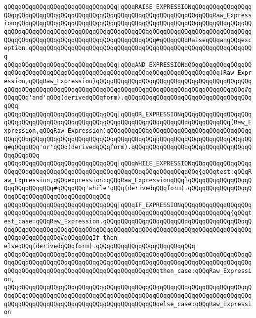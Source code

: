 \verb|qQQqqQQqqQQqqQQqqQQqqQQqqQQqqQQq|\verb#|qQQqRAISE_EXPRESSIONqQQqqQQqqQQqqQQqqQQqqQQqqQQqqQQqqQQqqQQqqQQqqQQqqQQqqQQqqQQqqQQqqQQqqQQqqQQqRaw_ExpressionqQQqqQQqqQQqqQQqqQQqqQQqqQQqqQQqqQQqqQQqqQQqqQQqqQQqqQQqqQQqqQQqqQQqqQQqqQQqqQQqqQQqqQQqqQQqqQQqqQQqqQQqqQQqqQQqqQQqqQQqqQQqqQQqqQQqqQQqqQQqqQQqqQQqqQQqqQQqqQQqqQQqqQQqqQQqqQQqqQQq#\verb|#qQQqqQQqRaiseqQQqanqQQqexception.qQQqqQQqqQQqqQQqqQQqqQQqqQQqqQQqqQQqqQQqqQQqqQQqqQQqqQQqqQQqqQQq|\newline
\verb|qQQqqQQqqQQqqQQqqQQqqQQqqQQqqQQq|\verb#|qQQqAND_EXPRESSIONqQQqqQQqqQQqqQQqqQQqqQQqqQQqqQQqqQQqqQQqqQQqqQQqqQQqqQQqqQQqqQQqqQQqqQQqqQQqqQQq(Raw_Expression,qQQqRaw_Expression)qQQqqQQqqQQqqQQqqQQqqQQqqQQqqQQqqQQqqQQqqQQqqQQqqQQqqQQqqQQqqQQqqQQqqQQqqQQqqQQqqQQqqQQqqQQqqQQqqQQqqQQqqQQqqQQq#\verb|#qQQqqQQq'and'qQQq(derivedqQQqform).qQQqqQQqqQQqqQQqqQQqqQQqqQQqqQQqqQQqqQQq|\newline
\verb|qQQqqQQqqQQqqQQqqQQqqQQqqQQqqQQq|\verb#|qQQqOR_EXPRESSIONqQQqqQQqqQQqqQQqqQQqqQQqqQQqqQQqqQQqqQQqqQQqqQQqqQQqqQQqqQQqqQQqqQQqqQQqqQQqqQQqqQQq(Raw_Expression,qQQqRaw_Expression)qQQqqQQqqQQqqQQqqQQqqQQqqQQqqQQqqQQqqQQqqQQqqQQqqQQqqQQqqQQqqQQqqQQqqQQqqQQqqQQqqQQqqQQqqQQqqQQqqQQqqQQqqQQqqQQq#\verb|#qQQqqQQq'or'qQQq(derivedqQQqform).qQQqqQQqqQQqqQQqqQQqqQQqqQQqqQQqqQQqqQQqqQQq|\newline
\verb|qQQqqQQqqQQqqQQqqQQqqQQqqQQqqQQq|\verb#|qQQqWHILE_EXPRESSIONqQQqqQQqqQQqqQQqqQQqqQQqqQQqqQQqqQQqqQQqqQQqqQQqqQQqqQQqqQQqqQQqqQQqqQQq{qQQqtest:qQQqRaw_Expression,qQQqexpression:qQQqRaw_ExpressionqQQq}qQQqqQQqqQQqqQQqqQQqqQQqqQQqqQQq#\verb|#qQQqqQQq'while'qQQq(derivedqQQqform).qQQqqQQqqQQqqQQqqQQqqQQqqQQqqQQqqQQqqQQqqQQqqQQq|\newline
\verb|qQQqqQQqqQQqqQQqqQQqqQQqqQQqqQQq|\verb#|qQQqIF_EXPRESSIONqQQqqQQqqQQqqQQqqQQqqQQqqQQqqQQqqQQqqQQqqQQqqQQqqQQqqQQqqQQqqQQqqQQqqQQqqQQqqQQqqQQq{qQQqtest_case:qQQqRaw_Expression,qQQqqQQqqQQqqQQqqQQqqQQqqQQqqQQqqQQqqQQqqQQqqQQqqQQqqQQqqQQqqQQqqQQqqQQqqQQqqQQqqQQqqQQqqQQqqQQqqQQqqQQqqQQqqQQqqQQqqQQqqQQqqQQq#\verb|#qQQqqQQqIf-then-elseqQQq(derivedqQQqform).qQQqqQQqqQQqqQQqqQQqqQQqqQQq|\newline
\verb|qQQqqQQqqQQqqQQqqQQqqQQqqQQqqQQqqQQqqQQqqQQqqQQqqQQqqQQqqQQqqQQqqQQqqQQqqQQqqQQqqQQqqQQqqQQqqQQqqQQqqQQqqQQqqQQqqQQqqQQqqQQqqQQqqQQqqQQqqQQqqQQqqQQqqQQqqQQqqQQqqQQqqQQqqQQqqQQqqQQqqQQqthen_case:qQQqRaw_Expression,|\newline
\verb|qQQqqQQqqQQqqQQqqQQqqQQqqQQqqQQqqQQqqQQqqQQqqQQqqQQqqQQqqQQqqQQqqQQqqQQqqQQqqQQqqQQqqQQqqQQqqQQqqQQqqQQqqQQqqQQqqQQqqQQqqQQqqQQqqQQqqQQqqQQqqQQqqQQqqQQqqQQqqQQqqQQqqQQqqQQqqQQqqQQqqQQqelse_case:qQQqRaw_Expression|\newline
